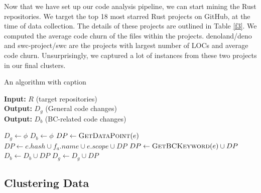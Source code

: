 Now that we have set up our code analysis pipeline, we can start mining the Rust repositories. We target the top 18 most starred Rust projects on GitHub, at the time of data collection. The details of these projects are outlined in Table \ref{f3}. We computed the average code churn of the files within the projects. denoland/deno and swc-project/swc are the projects with largest number of LOCs and average code churn. Unsurprisingly, we captured a lot of instances from these two projects in our final clusters.

\begin{algorithm}
\caption{An algorithm with caption}\label{alg:cap}
\hspace*{2mm} \textbf{Input:} $R$ (target repositories)  \\
\hspace*{2mm} \textbf{Output:} $D_g$ (General code changes) \\
\hspace*{2mm} \textbf{Output:} $D_b$ (BC-related code changes)
\begin{algorithmic}
\State $D_g \leftarrow \phi$
\State $D_b \leftarrow \phi$
                    \State $DP \leftarrow \textsc{GetDataPoint}(e)$
                    \State $DP \leftarrow c.hash \cup f_a.name \cup e.scope \cup DP $
                        \State $DP \leftarrow \textsc{GetBCKeyword}(e) \cup DP $
                        \State $D_b \leftarrow D_b \cup DP$
                    \Else
                        \State $D_g \leftarrow D_g \cup DP$
                    \EndIf
                \EndFor
            \EndFor
        \EndIf
    \EndFor
\EndFor
\end{algorithmic}
\end{algorithm}


\subsection{Clustering Data}





